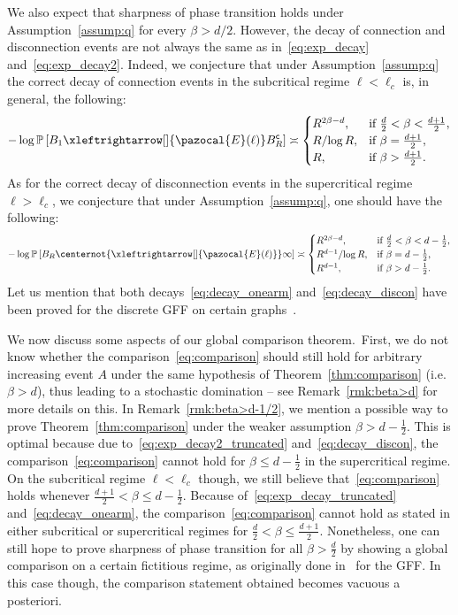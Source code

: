 \documentclass[AHL,Unicode,longabstracts,published]{cedram}
\renewcommand{\P}{\mathbb{P}}
\newcommand{\sfc}{\mathsf{c}}
\newcommand{\lr}[4]{#3\xleftrightarrow[#1]{#2} #4}
\newcommand{\nlr}[4]{#3\centernot{\xleftrightarrow[#1]{#2}} #4}
\begin{document}
We also expect that sharpness of phase transition holds under Assumption~\ref{assump:q} for every $\beta>d/2$. However, the decay of connection and disconnection events are not always the same as in~\eqref{eq:exp_decay} and~\eqref{eq:exp_decay2}. Indeed, we conjecture that under Assumption~\ref{assump:q} the correct decay of connection events in the subcritical regime $\ell<\ell_c$ is, in general, the following:
\begin{equation}\label{eq:decay_onearm}
-\log\P\left[\lr{}{\pazocal{E}(\ell)}{B_1}{B_R^{\sfc}}\right]\asymp
\begin{cases}
R^{2\beta-d}, & \text{if }\frac{d}{2}<\beta< \frac{d+1}{2},\\
{R}/{\log R}, & \text{if }\beta=\frac{d+1}{2},\\
R, & \text{if }\beta>\frac{d+1}{2}.
\end{cases}
\end{equation}
As for the correct decay of disconnection events in the supercritical regime $\ell>\ell_c$, we conjecture that under Assumption~\ref{assump:q}, one should have the following:
\begin{equation}\label{eq:decay_discon}
-\log\P\left[\nlr{}{\pazocal{E}(\ell)}{B_R}{\infty}\right]\asymp
\begin{cases}
R^{2\beta-d}, & \text{if }\frac{d}{2}<\beta<d-\frac{1}{2},\\
{R^{d-1}}/{\log R}, & \text{if }\beta=d-\frac{1}{2},\\
R^{d-1}, & \text{if }\beta>d-\frac{1}{2}.
\end{cases}
\end{equation}
Let us mention that both decays~\eqref{eq:decay_onearm} and~\eqref{eq:decay_discon} have been proved for the discrete GFF on certain graphs~\cite{DPR21,GRS21,nitzschner2018,nitzschner2017solidification,PopovRath15,MR3417515}.

We now discuss some aspects of our global comparison theorem.~First, we do not know whether the comparison~\eqref{eq:comparison} should still hold for arbitrary increasing event $A$ under the same hypothesis of Theorem~\ref{thm:comparison} (i.e.~$\beta>d$), thus leading to a stochastic domination -- see Remark~\ref{rmk:beta>d} for more details on this. In Remark~\ref{rmk:beta>d-1/2}, we mention a possible way to prove Theorem~\ref{thm:comparison} under the weaker assumption $\beta>d-\tfrac{1}{2}$. This is optimal because due to~\eqref{eq:exp_decay2_truncated} and~\eqref{eq:decay_discon}, the comparison~\eqref{eq:comparison} cannot hold for $\beta\leq d-\tfrac12$ in the supercritical regime. On the subcritical regime $\ell<\ell_c$ though, we still believe that~\eqref{eq:comparison} holds whenever $\tfrac{d+1}{2}<\beta\leq d-\tfrac{1}{2}$. Because of~\eqref{eq:exp_decay_truncated} and~\eqref{eq:decay_onearm}, the comparison~\eqref{eq:comparison} cannot hold as stated in either subcritical or supercritical regimes for $\tfrac{d}{2}<\beta\leq\tfrac{d+1}{2}$. Nonetheless, one can still hope to prove sharpness of phase transition for all $\beta>\tfrac{d}{2}$ by showing a global comparison on a certain fictitious regime, as originally done in~\cite{DGRS19} for the GFF. In this case though, the comparison statement obtained becomes vacuous a posteriori.
\end{document}
